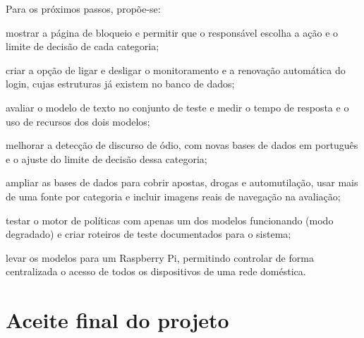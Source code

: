 \documentclass[
    12pt,           %
    oneside,        %
    a4paper,        %
    chapter=TITLE,  %
    english,        %
    brazil          %
]{abntex2}
\begin{document}
Para os próximos passos, propõe-se:

\begin{alineas}
    \item mostrar a página de bloqueio e permitir que o responsável escolha a
    ação e o limite de decisão de cada categoria;
    \item criar a opção de ligar e desligar o monitoramento e a renovação
    automática do login, cujas estruturas já existem no banco de dados;
    \item avaliar o modelo de texto no conjunto de teste e medir o tempo de
    resposta e o uso de recursos dos dois modelos;
    \item melhorar a detecção de discurso de ódio, com novas bases de dados em
    português e o ajuste do limite de decisão dessa categoria;
    \item ampliar as bases de dados para cobrir apostas, drogas e
    automutilação, usar mais de uma fonte por categoria e incluir imagens reais
    de navegação na avaliação;
    \item testar o motor de políticas com apenas um dos modelos funcionando
    (modo degradado) e criar roteiros de teste documentados para o sistema;
    \item levar os modelos para um Raspberry Pi, permitindo controlar de forma
    centralizada o acesso de todos os dispositivos de uma rede doméstica.
\end{alineas}
\chapter{Aceite final do projeto}



\postextual


\end{document}
